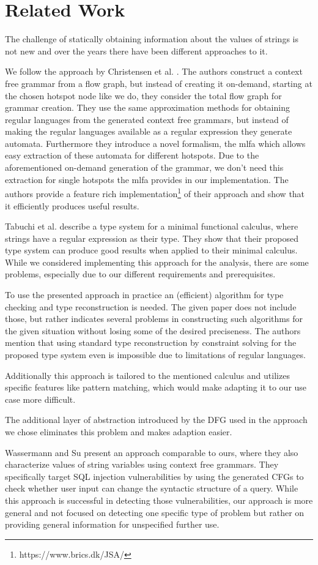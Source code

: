 \chapter{Related Work}
\label{chapter:RelatedWork}

The challenge of statically obtaining information about the values of strings is not new and over the years there have been different approaches to it.

We follow the approach by Christensen et al. \cite{brics}. The authors construct a context free grammar from a flow graph, but instead of creating it on-demand, starting at the chosen hotspot node like we do, they consider the total flow graph for grammar creation. 
They use the same approximation methods for obtaining regular languages from the generated context free grammars, but instead of making the regular languages available as a regular expression they generate automata.
Furthermore they introduce a novel formalism, the \ac{mlfa} which allows easy extraction of these automata for different hotspots. Due to the aforementioned on-demand generation of the grammar, we don't need this extraction for single hotspots the \ac{mlfa} provides in our implementation.
The authors provide a feature rich implementation\footnote{https://www.brics.dk/JSA/} of their approach and show that it efficiently produces useful results.


Tabuchi et al. \cite{regex_types} describe a type system for a minimal functional calculus, where strings have a regular expression as their type. They show that their proposed type system can produce good results when applied to their minimal calculus. While we considered implementing this approach for the analysis, there are some problems, especially due to our different requirements and prerequisites.

To use the presented approach in practice an (efficient) algorithm for type checking and type reconstruction is needed. 
The given paper does not include those, but rather indicates several problems in constructing such algorithms for the given situation without losing some of the desired preciseness.
The authors mention that using standard type reconstruction by constraint solving for the proposed type system even is impossible due to limitations of regular languages.

Additionally this approach is tailored to the mentioned calculus and utilizes specific features like pattern matching, which would make adapting it to our use case more difficult.

The additional layer of abstraction introduced by the DFG used in the approach we chose eliminates this problem and makes adaption easier.


Wassermann and Su \cite{sqli_wassermann_su} present an approach comparable to ours, where they also characterize values of string variables using context free grammars. They specifically target SQL injection vulnerabilities by using the generated CFGs to check whether user input can change the syntactic structure of a query. While this approach is successful in detecting those vulnerabilities, our approach is more general and not focused on detecting one specific type of problem but rather on providing general information for unspecified further use.